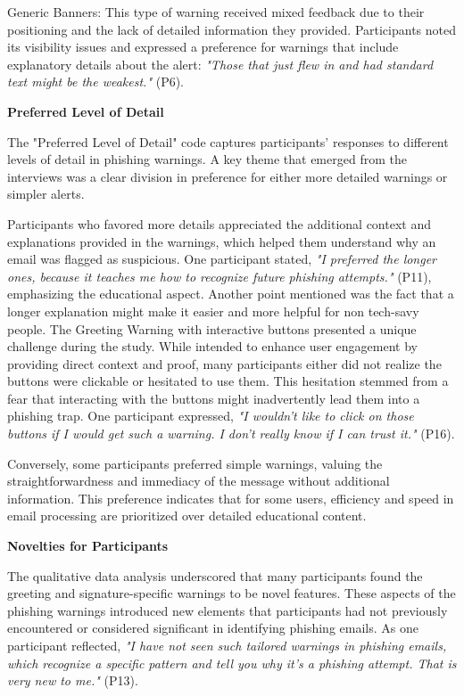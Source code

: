 \documentclass[
  a4paper,  %
  twoside,  %
  bibliography=totoc,
  headsepline,
  cleardoublepage=empty,
  parskip=half,
  draft=false
]{scrbook}
\begin{document}
Generic Banners: This type of warning received mixed feedback due to their positioning and the lack of detailed information they provided. Participants noted its visibility issues and expressed a preference for warnings that include explanatory details about the alert: \textit{"Those that just flew in and had standard text might be the weakest."} (P6). 

\textbf{Preferred Level of Detail}

The "Preferred Level of Detail" code captures participants' responses to different levels of detail in phishing warnings. A key theme that emerged from the interviews was a clear division in preference for either more detailed warnings or simpler alerts. \par
Participants who favored more details appreciated the additional context and explanations provided in the warnings, which helped them understand why an email was flagged as suspicious. One participant stated, \textit{"I preferred the longer ones, because it teaches me how to recognize future phishing attempts."} (P11), emphasizing the educational aspect. Another point mentioned was the fact that a longer explanation might make it easier and more helpful for non tech-savy people. The Greeting Warning with interactive buttons presented a unique challenge during the study. While intended to enhance user engagement by providing direct context and proof, many participants either did not realize the buttons were clickable or hesitated to use them. This hesitation stemmed from a fear that interacting with the buttons might inadvertently lead them into a phishing trap. One participant expressed, \textit{"I wouldn’t like to click on those buttons if I would get such a warning. I don’t really know if I can trust it."} (P16). \par
Conversely, some participants preferred simple warnings, valuing the straightforwardness and immediacy of the message without additional information. This preference indicates that for some users, efficiency and speed in email processing are prioritized over detailed educational content. \newpage

\textbf{Novelties for Participants}

The qualitative data analysis underscored that many participants found the greeting and signature-specific warnings to be novel features. These aspects of the phishing warnings introduced new elements that participants had not previously encountered or considered significant in identifying phishing emails. As one participant reflected, \textit{"I have not seen such tailored warnings in phishing emails, which recognize a specific pattern and tell you why it's a phishing attempt. That is very new to me."} (P13).
\end{document}
